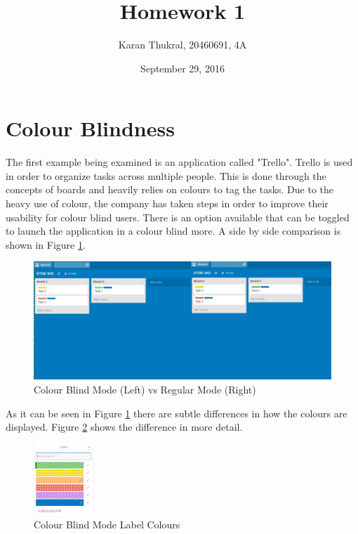 \documentclass[12pt]{article}
\title{Homework 1}
\author{Karan Thukral, 20460691, 4A}
\date{September 29, 2016}
\begin{document}
	\makereporttitle

	\tableofcontents
	\newpage

	\startarabicpagenumbers

	\section{Colour Blindness}
	The first example being examined is an application called "Trello". Trello is used in order to organize tasks across multiple people. This is done through the concepts of boards and heavily relies on colours to tag the tasks. Due to the heavy use of colour, the company has taken steps in order to improve their usability for colour blind users. There is an option available that can be toggled to launch the application in a colour blind more. A side by side comparison is shown in Figure \ref{trelloimg}.
	
	\begin{figure}[!ht]
		\centering
		\includegraphics[width=1.0\textwidth]{trelloImage}
		\caption{Colour Blind Mode (Left) vs Regular Mode (Right)}
		\label{trelloimg}
	\end{figure}
	
	As it can be seen in Figure \ref{trelloimg} there are subtle differences in how the colours are displayed. Figure \ref{trelloLabels} shows the difference in more detail.
	
	\begin{figure}[!ht]
		\centering
		\includegraphics[width=0.2\textwidth]{trelloLabels}
		\caption{Colour Blind Mode Label Colours}
		\label{trelloLabels}
	\end{figure}
	
\end{document}
